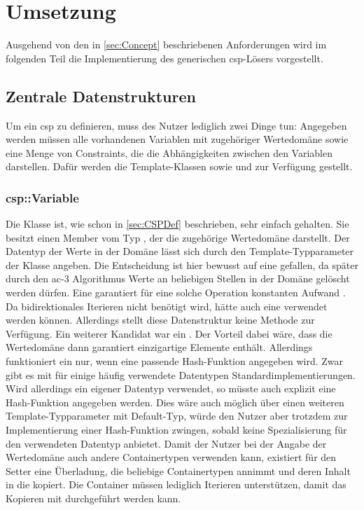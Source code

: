 \section{Umsetzung}
Ausgehend von den in \cref{sec:Concept} beschriebenen Anforderungen wird im folgenden Teil die Implementierung des generischen \ac*{csp}-Lösers vorgestellt.

\subsection{Zentrale Datenstrukturen}
Um ein \ac*{csp} zu definieren, muss des Nutzer lediglich zwei Dinge tun: Angegeben werden müssen alle vorhandenen Variablen mit zugehöriger Wertedomäne sowie eine Menge von
Constraints, die die Abhängigkeiten zwischen den Variablen darstellen. Dafür werden die Template-Klassen  sowie  und
 zur Verfügung gestellt.

\subsubsection{csp::Variable}
Die Klasse  ist, wie schon in \cref{sec:CSPDef} beschrieben, sehr einfach gehalten. Sie besitzt einen Member vom Typ , der die zugehörige
Wertedomäne darstellt. Der Datentyp der Werte in der Domäne lässt sich durch den Template-Typparameter der Klasse angeben. Die Entscheidung ist hier bewusst auf eine
 gefallen, da später durch den \ac*{ac}-3 Algorithmus Werte an beliebigen Stellen in der Domäne gelöscht werden dürfen. Eine  garantiert für
eine solche Operation konstanten Aufwand \cite{stdList}. Da bidirektionales Iterieren nicht benötigt wird, hätte auch eine  verwendet werden können.
Allerdings stellt diese Datenstruktur keine Methode  zur Verfügung. Ein weiterer Kandidat war ein . Der Vorteil dabei wäre, dass die
Wertedomäne dann garantiert einzigartige Elemente enthält. Allerdings funktioniert ein  nur, wenn eine passende Hash-Funktion angegeben wird. Zwar gibt
es mit  für einige häufig verwendete Datentypen Standardimplementierungen. Wird allerdings ein eigener Datentyp verwendet, so müsste auch explizit eine
Hash-Funktion angegeben werden. Dies wäre auch möglich über einen weiteren Template-Typparameter mit Default-Typ, würde den Nutzer aber trotzdem zur Implementierung einer
Hash-Funktion zwingen, sobald  keine Spezialisierung für den verwendeten Datentyp anbietet. Damit der Nutzer bei der Angabe der Wertedomäne auch andere
Containertypen verwenden kann, existiert für den Setter  eine Überladung, die beliebige Containertypen annimmt und deren Inhalt in die 
kopiert. Die Container müssen lediglich Iterieren unterstützen, damit das Kopieren mit  durchgeführt werden kann.

